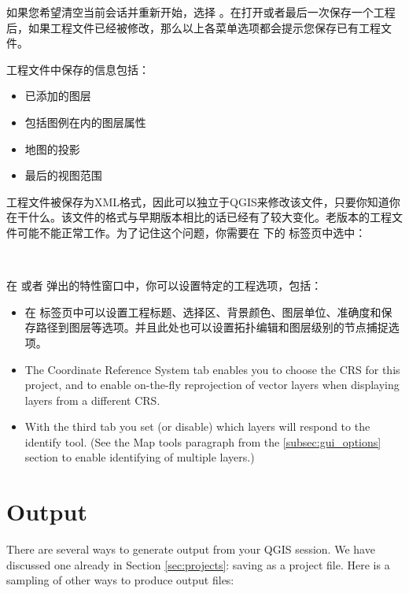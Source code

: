 如果您希望清空当前会话并重新开始，选择  \arrow {} 。在打开或者最后一次保存一个工程后，如果工程文件已经被修改，那么以上各菜单选项都会提示您保存已有工程文件。

工程文件中保存的信息包括：

\begin{itemize}
\item 已添加的图层
\item 包括图例在内的图层属性
\item 地图的投影
\item 最后的视图范围
\end{itemize}

工程文件被保存为XML格式，因此可以独立于QGIS来修改该文件，只要你知道你在干什么。该文件的格式与早期版本相比的话已经有了较大变化。老版本的工程文件可能不能正常工作。为了记住这个问题，你需要在  \arrow {} 下的  标签页中选中：

 \\

在  或者  弹出的特性窗口中，你可以设置特定的工程选项，包括：

\begin{itemize}
\item 在  标签页中可以设置工程标题、选择区、背景颜色、图层单位、准确度和保存路径到图层等选项。并且此处也可以设置拓扑编辑和图层级别的节点捕捉选项。
\item The  Coordinate Reference System tab enables you to choose the
CRS for this project, and to enable on-the-fly reprojection of vector layers
when displaying layers from a different CRS.
\item With the third  tab you set (or disable) which
layers will respond to the identify tool. (See the Map tools paragraph from
the \ref{subsec:gui_options} section to enable identifying of multiple layers.)
\end{itemize}

\section{Output}\label{sec:output}

There are several ways to generate output from your QGIS session. We have
discussed one already in Section \ref{sec:projects}: saving as a project file.
Here is a sampling of other ways to produce output files:

